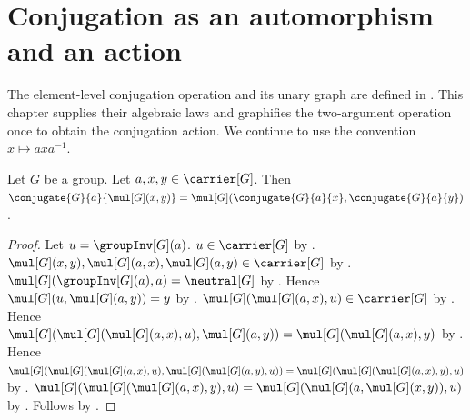 




\section{Conjugation as an automorphism and an action}

The element-level conjugation operation and its unary graph are defined in
.  This chapter supplies their algebraic
laws and graphifies the two-argument operation once to obtain the conjugation
action.  We continue to use the convention $x\mapsto axa^{-1}$.

\begin{theorem}\label{group_conjugate_mul}
    Let $G$ be a group.
    Let $a,x,y\in\carrier[G]$.
    Then
        $\conjugate{G}{a}{\mul[G](x,y)}=
            \mul[G](\conjugate{G}{a}{x},\conjugate{G}{a}{y})$.
\end{theorem}
\begin{proof}
    Let $u=\groupInv[G](a)$.
    $u\in\carrier[G]$ by
        .
    $\mul[G](x,y),\mul[G](a,x),\mul[G](a,y)\in\carrier[G]$ by
        .
    $\mul[G](\groupInv[G](a),a)=\neutral[G]$ by
        .
    Hence $\mul[G](u,\mul[G](a,y))=y$ by
        .
    $\mul[G](\mul[G](a,x),u)\in\carrier[G]$ by
        .
    Hence
        $\mul[G](\mul[G](\mul[G](a,x),u),\mul[G](a,y))=
            \mul[G](\mul[G](a,x),y)$ by
        .
    Hence
        $\mul[G](
            \mul[G](\mul[G](a,x),u),
            \mul[G](\mul[G](a,y),u))=
         \mul[G](\mul[G](\mul[G](a,x),y),u)$ by
        .
    $\mul[G](\mul[G](\mul[G](a,x),y),u)=
        \mul[G](\mul[G](a,\mul[G](x,y)),u)$ by
        .
    Follows by .
\end{proof}

